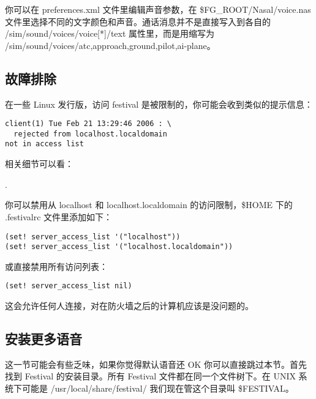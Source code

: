 你可以在 preferences.xml 文件里编辑声音参数，在 \$FG\_ROOT/Nasal/voice.nas 文件里选择不同的文字颜色和声音。通话消息并不是直接写入到各自的 /sim/sound/voices/voice[*]/text 属性里，而是用缩写为 /sim/sound/voices/{atc,approach,ground,pilot,ai-plane}。

\subsection{故障排除}

在一些 Linux 发行版，访问 festival 是被限制的，你可能会收到类似的提示信息：

\begin{verbatim}
client(1) Tue Feb 21 13:29:46 2006 : \
  rejected from localhost.localdomain
not in access list
\end{verbatim}

相关细节可以看：

.

你可以禁用从 localhost 和 localhost.localdomain 的访问限制，\$HOME 下的 .festivalrc 文件里添加如下：

\begin{verbatim}
(set! server_access_list '("localhost"))
(set! server_access_list '("localhost.localdomain"))
\end{verbatim}

或直接禁用所有访问列表：

\begin{verbatim}
(set! server_access_list nil)
\end{verbatim}

这会允许任何人连接，对在防火墙之后的计算机应该是没问题的。

\subsection{安装更多语音}

这一节可能会有些乏味，如果你觉得默认语音还 OK 你可以直接跳过本节。首先找到 Festival 的安装目录。所有 Festival 文件都在同一个文件树下。在 UNIX 系统下可能是 /usr/local/share/festival/ 我们现在管这个目录叫 \$FESTIVAL。

